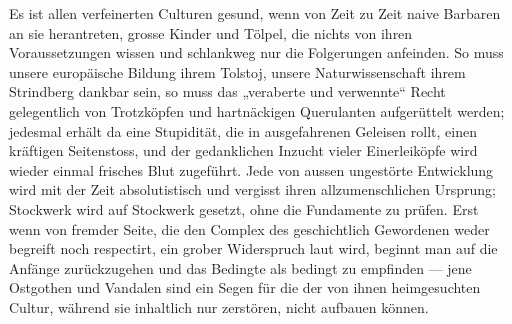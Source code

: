 Es ist allen verfeinerten Culturen gesund, wenn von Zeit zu Zeit naive Barbaren an sie herantreten, grosse Kinder und Tölpel, die nichts von ihren Voraussetzungen wissen und schlankweg nur die Folgerungen anfeinden. So muss unsere europäische Bildung ihrem Tolstoj, unsere Naturwissenschaft ihrem Strindberg dankbar sein, so muss das „veraberte und verwennte“ Recht gelegentlich von Trotzköpfen und hartnäckigen Querulanten aufgerüttelt werden; jedesmal erhält da eine Stupidität, die in ausgefahrenen Geleisen rollt, einen kräftigen Seitenstoss, und der gedanklichen Inzucht vieler Einerleiköpfe wird wieder einmal frisches Blut zugeführt. Jede von aussen ungestörte Entwicklung wird mit der Zeit absolutistisch und vergisst ihren allzumenschlichen Ursprung; Stockwerk wird auf Stockwerk gesetzt, ohne die Fundamente zu prüfen. Erst wenn von fremder Seite, die den Complex des geschichtlich Gewordenen weder begreift noch respectirt, ein grober Widerspruch laut wird, beginnt man auf die Anfänge zurückzugehen und das Bedingte als bedingt zu empfinden — jene Ostgothen und Vandalen sind ein Segen für die  der von ihnen heimgesuchten Cultur, während sie inhaltlich nur zerstören, nicht aufbauen können.
\par

